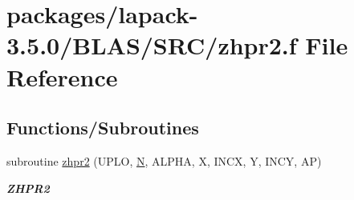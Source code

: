 \hypertarget{lapack-3_85_80_2BLAS_2SRC_2zhpr2_8f}{}\section{packages/lapack-\/3.5.0/\+B\+L\+A\+S/\+S\+R\+C/zhpr2.f File Reference}
\label{lapack-3_85_80_2BLAS_2SRC_2zhpr2_8f}
\subsection*{Functions/\+Subroutines}
\begin{DoxyCompactItemize}
\item 
subroutine \hyperlink{group__complex16__blas__level2_ga44a6afc0e18dc1b5d50bf12b79129843}{zhpr2} (U\+P\+L\+O, \hyperlink{polmisc_8c_a0240ac851181b84ac374872dc5434ee4}{N}, A\+L\+P\+H\+A, X, I\+N\+C\+X, Y, I\+N\+C\+Y, A\+P)
\begin{DoxyCompactList}\small\item\em {\bfseries Z\+H\+P\+R2} \end{DoxyCompactList}\end{DoxyCompactItemize}
